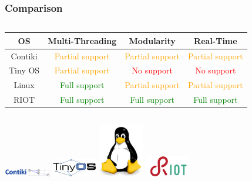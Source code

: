 \documentclass{beamer}
\begin{document}
\begin{frame}
	\frametitle{Comparison}
	\begin{columns}[c]
		\begin{column}{30cm}
			\hspace{0.9cm}
			\begin{tabular}{ | c | c | c | c |}
				\hline
				OS & Multi-Threading & Modularity & Real-Time \\ \hline
				Contiki & \textcolor{orange}{Partial support} &
				\textcolor{orange}{Partial support} &
				\textcolor{orange}{Partial support} \\ \hline
				Tiny OS & \textcolor{orange}{Partial support} &
				\textcolor{red}{No support} &
				\textcolor{red}{No support} \\ \hline
				Linux & \textcolor{green}{Full support} &
				\textcolor{orange}{Partial support} &
				\textcolor{orange}{Partial support} \\ \hline
				RIOT & \textcolor{green}{Full support} &
				\textcolor{green}{Full support} &
				\textcolor{green}{Full support} \\ \hline
			\end{tabular}
		\end{column}
	\end{columns}
	\vspace{.5cm}
	\hspace*{1cm}
	\includegraphics[width=2cm]{figs/contiki-logo.png}
	\hspace*{.5cm}
	\includegraphics[width=2cm]{figs/tinyos-logo.jpg}
	\hspace*{.5cm}
	\includegraphics[width=2cm]{figs/linux-logo.jpeg}
	\hspace*{.5cm}
	\includegraphics[width=2cm]{figs/riot-logo.png}
\end{frame}
\end{document}
